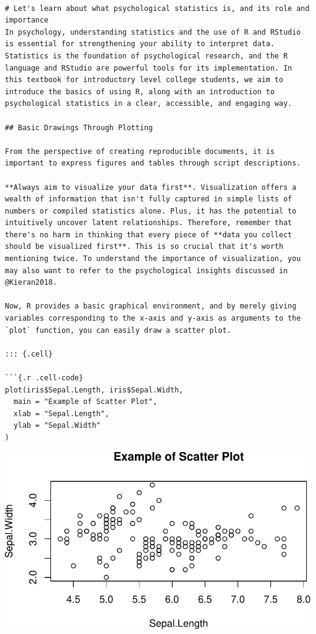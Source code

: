 \documentclass[
  a4paper,
]{book}
\begin{document}
\begin{verbatim}

# Let's learn about what psychological statistics is, and its role and importance
In psychology, understanding statistics and the use of R and RStudio is essential for strengthening your ability to interpret data. Statistics is the foundation of psychological research, and the R language and RStudio are powerful tools for its implementation. In this textbook for introductory level college students, we aim to introduce the basics of using R, along with an introduction to psychological statistics in a clear, accessible, and engaging way.

## Basic Drawings Through Plotting

From the perspective of creating reproducible documents, it is important to express figures and tables through script descriptions.

**Always aim to visualize your data first**. Visualization offers a wealth of information that isn't fully captured in simple lists of numbers or compiled statistics alone. Plus, it has the potential to intuitively uncover latent relationships. Therefore, remember that there's no harm in thinking that every piece of **data you collect should be visualized first**. This is so crucial that it's worth mentioning twice. To understand the importance of visualization, you may also want to refer to the psychological insights discussed in @Kieran2018.

Now, R provides a basic graphical environment, and by merely giving variables corresponding to the x-axis and y-axis as arguments to the `plot` function, you can easily draw a scatter plot.

::: {.cell}

```{.r .cell-code}
plot(iris$Sepal.Length, iris$Sepal.Width,
  main = "Example of Scatter Plot",
  xlab = "Sepal.Length",
  ylab = "Sepal.Width"
)
\end{verbatim}

\includegraphics{chapter04_files/figure-pdf/RplotSample-1.pdf}
\end{document}
